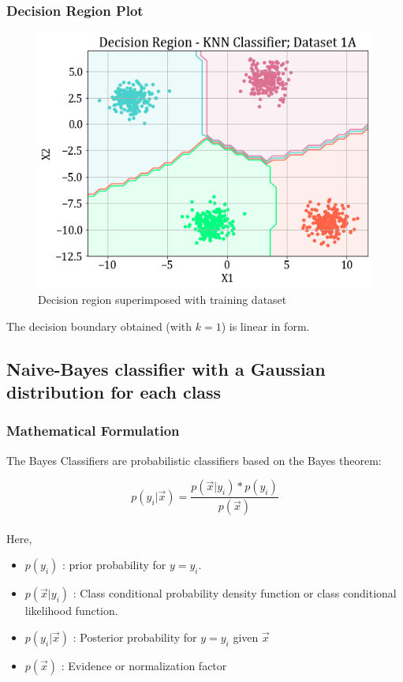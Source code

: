 \documentclass[11pt,a4paper]{article}
\newcommand{\noi}{\noindent}
\begin{document}
\subsubsection{Decision Region Plot}
\begin{figure}[H]
    \centering
    \includegraphics[scale=0.7]{images/1A/1A_knn_decision_region.png}
    \caption{Decision region superimposed with training dataset}
    \label{fig:1A_decreg_KNN}
\end{figure}

The decision boundary obtained (with $k=1$) is linear in form. 

\break
\subsection{Naive-Bayes classifier with a Gaussian distribution for each class}
\subsubsection{Mathematical Formulation}
The Bayes Classifiers are probabilistic classifiers based on the Bayes theorem:

\begin{equation}
\label{eqn nb}
    p(y_{i}|\vec{x})=\frac{p(\vec{x}|y_{i})*p(y_{i})}{p(\vec{x})}
\end{equation}\\

\noi
Here,
\begin{itemize}
    \itemsep0em
    \item $p(y_{i})$ : prior probability for $y=y_{i}$.
    \item $p(\vec{x}|y_{i})$ : Class conditional probability density function or class conditional likelihood function.
    \item $p(y_{i}|\vec{x})$ : Posterior probability for $y=y_{i}$ given $\vec{x}$
    \item $p(\vec{x})$ : Evidence or normalization factor
\end{itemize}
\end{document}
